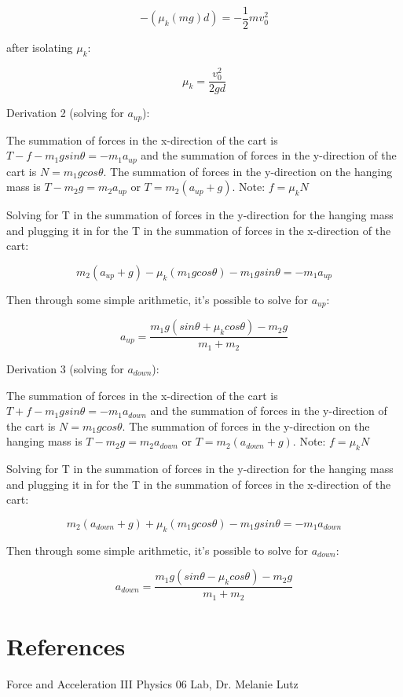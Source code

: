 \documentclass[aps,letterpaper,11pt]{revtex4}
\begin{document}
$$ -(\mu_k(mg)d) = -\frac{1}{2}mv_0^2 $$

after isolating $\mu_k$:

$$ \mu_k = \frac{v_0^2}{2gd}$$

Derivation 2 (solving for $a_{up}$):

\begin{center}

\end{center}

The summation of forces in the x-direction of the cart is $T-f-m_1gsin\theta = -m_1a_{up}$ and the summation of forces in the y-direction of the cart is $N = m_1gcos\theta$.
The summation of forces in the y-direction on the hanging mass is $T-m_2g = m_2a_{up}$ or $T = m_2(a_{up} + g)$. Note: $f = \mu_kN$

Solving for T in the summation of forces in the y-direction for the hanging mass and plugging it in for the T in the summation of forces in the x-direction of the cart:

$$ m_2(a_{up}+g)-\mu_k(m_1gcos\theta)-m_1gsin\theta = -m_1a_{up}$$

Then through some simple arithmetic, it's possible to solve for $a_{up}$:

$$ a_{up} = \frac{m_1g(sin\theta+\mu_kcos\theta)-m_2g}{m_1+m_2}$$

Derivation 3 (solving for $a_{down}$):

\begin{center}

\end{center}

The summation of forces in the x-direction of the cart is $T+f-m_1gsin\theta = -m_1a_{down}$ and the summation of forces in the y-direction of the cart is $N = m_1gcos\theta$.
The summation of forces in the y-direction on the hanging mass is $T-m_2g = m_2a_{down}$ or $T = m_2(a_{down} + g)$. Note: $f = \mu_kN$

Solving for T in the summation of forces in the y-direction for the hanging mass and plugging it in for the T in the summation of forces in the x-direction of the cart:

$$ m_2(a_{down}+g)+\mu_k(m_1gcos\theta)-m_1gsin\theta = -m_1a_{down}$$

Then through some simple arithmetic, it's possible to solve for $a_{down}$:

$$ a_{down} = \frac{m_1g(sin\theta-\mu_kcos\theta)-m_2g}{m_1+m_2}$$





\section{References}

\hspace{-6.5mm}
Force and Acceleration III Physics 06 Lab, Dr. Melanie Lutz\\
\end{document}
